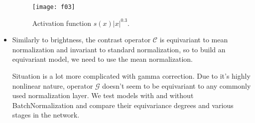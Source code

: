 \begin{itemize}
    \begin{figure}[h]
        \centering
        \texttt{[image: f03]}
        \caption{Activation function $s(x)|x|^{0.3}$.}
        \label{fig:f03}
    \end{figure}
\item Similarly to brightness, the contrast operator $\mathcal{C}$ is
    equivariant to mean normalization and invariant to standard normalization,
    so to build an equivariant model, we need to use the mean normalization.

    Situation is a lot more complicated with gamma correction. Due to it's
    highly nonlinear nature, operator
    $\mathcal{G}$ doesn't seem to be equivariant to any
    commonly used normalization layer. We test models with and without
    BatchNormalization and compare their equivariance degrees and various stages
    in the network.
\end{itemize}







